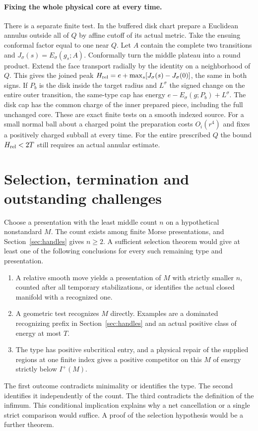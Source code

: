 \documentclass[11pt,letterpaper]{article}
\numberwithin{equation}{section}
\begin{document}
\paragraph{Fixing the whole physical core at every time.}
There is a separate finite test. In the buffered disk chart prepare
a Euclidean annulus outside all of \(Q\) by affine cutoff of its
actual metric. Take the ensuing conformal factor equal to one near \(Q\). Let \(A\) contain the complete two transitions and
\(J_\sigma(s)=E_\sigma(g_s;A)\). Conformally turn the middle plateau
into a round product. Extend the face transport radially by the
identity on a neighborhood of \(Q\). This gives the joined peak
\(H_{\rm rel}=e+\max_s[J_\sigma(s)-J_\sigma(0)]\), the same in
both signs. If \(P_b\) is the disk inside the target radius and
\(L^\sigma\) the signed change on the entire outer transition, the
same-type cap has energy \(e-E_\sigma(g;P_b)+L^\sigma\).
The disk cap has the common charge of the inner prepared piece,
including the full unchanged core. These are exact finite tests on
a smooth indexed source. For a small normal ball about a charged
point the preparation costs \(O_i(r^4)\) and fixes a positively
charged subball at every time. For the entire prescribed \(Q\)
the bound \(H_{\rm rel}<2T\) still requires an actual annular
estimate.

\section{Selection, termination and outstanding challenges}

Choose a presentation with the least middle count \(n\) on a
hypothetical nonstandard \(M\). The count exists among finite Morse
presentations, and Section~\ref{sec:handles} gives \(n\ge2\). A sufficient
selection theorem would give at least one of the following conclusions
for every such remaining type and presentation.
\begin{enumerate}
\item A relative smooth move yields a presentation of \(M\) with
strictly smaller \(n\), counted after all temporary stabilizations,
or identifies the actual closed manifold with a recognized one.
\item A geometric test recognizes \(M\) directly. Examples are a
dominated recognizing prefix in Section~\ref{sec:handles} and an
actual positive class of energy at most \(T\).
\item The type has positive subcritical entry, and a physical repair
of the supplied regions at one finite index gives a positive
competitor on this \(M\) of energy strictly below \(I^+(M)\).
\end{enumerate}
The first outcome contradicts minimality or identifies the type.
The second identifies it independently of the count. The third
contradicts the definition of the infimum. This conditional implication
explains why a net cancellation or a single strict comparison would
suffice. A proof of the selection hypothesis would be a further
theorem.
\end{document}
